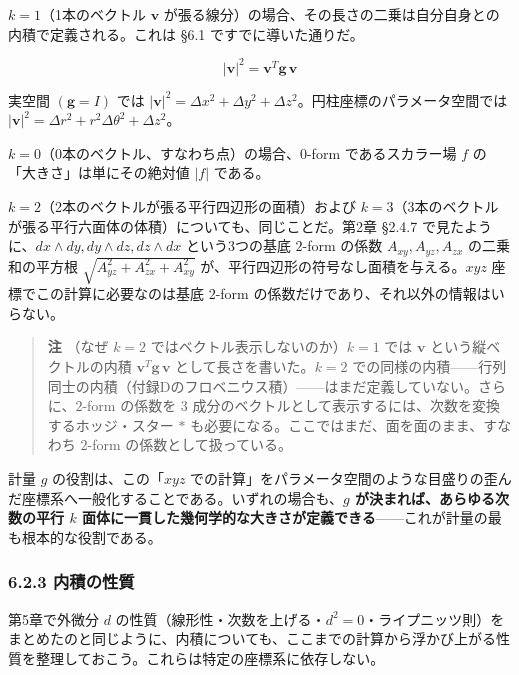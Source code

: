 \documentclass[a4paper,12pt,openany]{book}
\begin{document}
\(k=1\)（1本のベクトル \(\mathbf{v}\)
が張る線分）の場合、その長さの二乗は自分自身との内積で定義される。これは
§6.1 ですでに導いた通りだ。

\[|\mathbf{v}|^2 = \mathbf{v}^T \mathbf{g} \,\mathbf{v}\]

実空間 \((\mathbf{g}=I)\) では
\(|\mathbf{v}|^2 = \Delta x^2 + \Delta y^2 + \Delta z^2\)。円柱座標のパラメータ空間では
\(|\mathbf{v}|^2 = \Delta r^2 + r^2\Delta\theta^2 + \Delta z^2\)。

\(k=0\)（0本のベクトル、すなわち点）の場合、\(0\)-form であるスカラー場
\(f\) の「大きさ」は単にその絶対値 \(|f|\) である。

\(k=2\)（2本のベクトルが張る平行四辺形の面積）および
\(k=3\)（3本のベクトルが張る平行六面体の体積）についても、同じことだ。第2章
§2.4.7 で見たように、\(dx \wedge dy, dy \wedge dz, dz \wedge dx\)
という3つの基底 \(2\)-form の係数 \(A_{xy}, A_{yz}, A_{zx}\)
の二乗和の平方根 \(\sqrt{A_{yz}^2 + A_{zx}^2 + A_{xy}^2}\)
が、平行四辺形の符号なし面積を与える。\(xyz\)
座標でこの計算に必要なのは基底 \(2\)-form
の係数だけであり、それ以外の情報はいらない。

\begin{quote}
\textbf{注} （なぜ \(k=2\) ではベクトル表示しないのか）\(k=1\) では
\(\mathbf{v}\) という縦ベクトルの内積
\(\mathbf{v}^T\mathbf{g}\,\mathbf{v}\) として長さを書いた。\(k=2\)
での同様の内積——行列同士の内積（付録Dのフロベニウス積）——はまだ定義していない。さらに、\(2\)-form
の係数を \(3\)
成分のベクトルとして表示するには、次数を変換するホッジ・スター \(\ast\)
も必要になる。ここではまだ、面を面のまま、すなわち \(2\)-form
の係数として扱っている。
\end{quote}

計量 \(g\) の役割は、この「\(xyz\)
での計算」をパラメータ空間のような目盛りの歪んだ座標系へ一般化することである。いずれの場合も、\textbf{$g$ が決まれば、あらゆる次数の平行 $k$ 面体に一貫した幾何学的な大きさが定義できる}——これが計量の最も根本的な役割である。

\hypertarget{ux5185ux7a4dux306eux6027ux8cea}{%
\subsubsection{6.2.3 内積の性質}\label{ux5185ux7a4dux306eux6027ux8cea}}

第5章で外微分 \(d\)
の性質（線形性・次数を上げる・\(d^2=0\)・ライプニッツ則）をまとめたのと同じように、内積についても、ここまでの計算から浮かび上がる性質を整理しておこう。これらは特定の座標系に依存しない。
\end{document}
